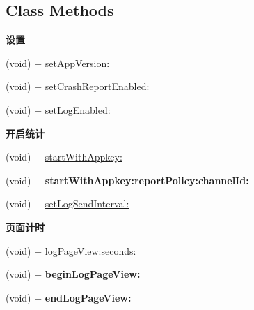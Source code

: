 \subsection*{Class Methods}
\begin{Indent}\textbf{ 设置}\par
{\em 

 

 }\begin{DoxyCompactItemize}
\item 
(void) + \hyperlink{interfaceMobClick_a934922e6c7dc1b8f34e02dcb82968ed6}{set\+App\+Version\+:}
\item 
(void) + \hyperlink{interfaceMobClick_a00b8fff5d1fc59e7bb0b740db5cf7b5e}{set\+Crash\+Report\+Enabled\+:}
\item 
(void) + \hyperlink{interfaceMobClick_a258af608440a9cc0759cb66692673acf}{set\+Log\+Enabled\+:}
\end{DoxyCompactItemize}
\end{Indent}
\begin{Indent}\textbf{ 开启统计}\par
{\em 

 

 }\begin{DoxyCompactItemize}
\item 
(void) + \hyperlink{interfaceMobClick_a449182df1231225e1032f30e92889c48}{start\+With\+Appkey\+:}
\item 
\mbox{\label{interfaceMobClick_a6be9c78c932aafc24966e8cd6ffbd06b}} 
(void) + {\bfseries start\+With\+Appkey\+:report\+Policy\+:channel\+Id\+:}
\item 
(void) + \hyperlink{interfaceMobClick_a713f1465c188481da6ce858594300590}{set\+Log\+Send\+Interval\+:}
\end{DoxyCompactItemize}
\end{Indent}
\begin{Indent}\textbf{ 页面计时}\par
{\em 

 

 }\begin{DoxyCompactItemize}
\item 
(void) + \hyperlink{interfaceMobClick_a6562f7da7a0c79dbc384db83548aafce}{log\+Page\+View\+:seconds\+:}
\item 
\mbox{\label{interfaceMobClick_ac2c3fd6cc4512c0d69ce6f5cb9ec5b4e}} 
(void) + {\bfseries begin\+Log\+Page\+View\+:}
\item 
\mbox{\label{interfaceMobClick_a32869cef6372cbafce4994b07ddb1c11}} 
(void) + {\bfseries end\+Log\+Page\+View\+:}
\end{DoxyCompactItemize}
\end{Indent}
